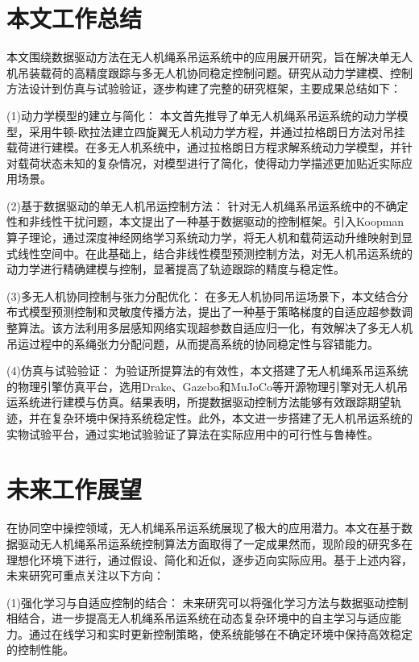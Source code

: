 \documentclass[lang=chs, degree=master, blindreview=false, winfonts=true]{yanputhesis}
\begin{document}
\section{本文工作总结}
本文围绕数据驱动方法在无人机绳系吊运系统中的应用展开研究，旨在解决单无人机吊装载荷的高精度跟踪与多无人机协同稳定控制问题。研究从动力学建模、控制方法设计到仿真与试验验证，逐步构建了完整的研究框架，主要成果总结如下：

(1)动力学模型的建立与简化：
本文首先推导了单无人机绳系吊运系统的动力学模型，采用牛顿-欧拉法建立四旋翼无人机动力学方程，并通过拉格朗日方法对吊挂载荷进行建模。在多无人机系统中，通过拉格朗日方程求解系统动力学模型，并针对载荷状态未知的复杂情况，对模型进行了简化，使得动力学描述更加贴近实际应用场景。

(2)基于数据驱动的单无人机吊运控制方法：
针对无人机绳系吊运系统中的不确定性和非线性干扰问题，本文提出了一种基于数据驱动的控制框架。引入Koopman算子理论，通过深度神经网络学习系统动力学，将无人机和载荷运动升维映射到显式线性空间中。在此基础上，结合非线性模型预测控制方法，对无人机吊运系统的动力学进行精确建模与控制，显著提高了轨迹跟踪的精度与稳定性。

(3)多无人机协同控制与张力分配优化：
在多无人机协同吊运场景下，本文结合分布式模型预测控制和灵敏度传播方法，提出了一种基于策略梯度的自适应超参数调整算法。该方法利用多层感知网络实现超参数自适应归一化，有效解决了多无人机吊运过程中的系绳张力分配问题，从而提高系统的协同稳定性与容错能力。

(4)仿真与试验验证：
为验证所提算法的有效性，本文搭建了无人机绳系吊运系统的物理引擎仿真平台，选用Drake、Gazebo和MuJoCo等开源物理引擎对无人机吊运系统进行建模与仿真。结果表明，所提数据驱动控制方法能够有效跟踪期望轨迹，并在复杂环境中保持系统稳定性。此外，本文进一步搭建了无人机吊运系统的实物试验平台，通过实地试验验证了算法在实际应用中的可行性与鲁棒性。

\section{未来工作展望}
在协同空中操控领域，无人机绳系吊运系统展现了极大的应用潜力。本文在基于数据驱动无人机绳系吊运系统控制算法方面取得了一定成果然而，现阶段的研究多在理想化环境下进行，通过假设、简化和近似，逐步迈向实际应用。基于上述内容，未来研究可重点关注以下方向：

(1)强化学习与自适应控制的结合：
未来研究可以将强化学习方法与数据驱动控制相结合，进一步提高无人机绳系吊运系统在动态复杂环境中的自主学习与适应能力。通过在线学习和实时更新控制策略，使系统能够在不确定环境中保持高效稳定的控制性能。
\end{document}
